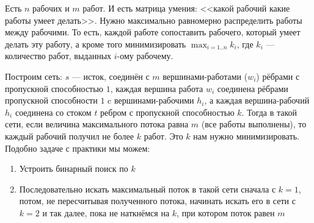 \begin{task}[4]
Есть $n$ рабочих и $m$ работ. И есть матрица умения: <<какой рабочий какие работы умеет делать>>. Нужно максимально равномерно распределить работы между рабочими. То есть, каждой работе сопоставить рабочего, который умеет делать эту работу, а кроме того минимизировать $\max_{i=1..n}{k_i}$, где $k_i$ --- количество работ, выданных $i$-ому рабочему.
\end{task}
\begin{solution}
Построим сеть: $s$ --- исток, соединён с $m$ вершинами-работами ($w_i$) рёбрами с пропускной способностью $1$, каждая вершина работа $w_i$ соединена рёбрами пропускной способности $1$ c вершинами-рабочими $h_i$, а каждая вершина-рабочий $h_i$ соединена со стоком $t$ ребром с пропускной способностью $k$. Тогда в такой сети, если величина максимального потока равна $m$ (все работы выполнены), то каждый рабочий получил не более $k$ работ. Это $k$ нам нужно минимизировать. Подобно задаче с практики мы можем: 
	\begin{enumerate}
		\item Устроить бинарный поиск по $k$
		\item Последовательно искать максимальный поток в такой сети сначала с $k=1$, потом, не пересчитывая полученного потока, начинать искать его в сети с $k=2$ и так далее, пока не наткнёмся на $k$, при котором поток равен $m$
	\end{enumerate}
\xqed
\end{solution}
